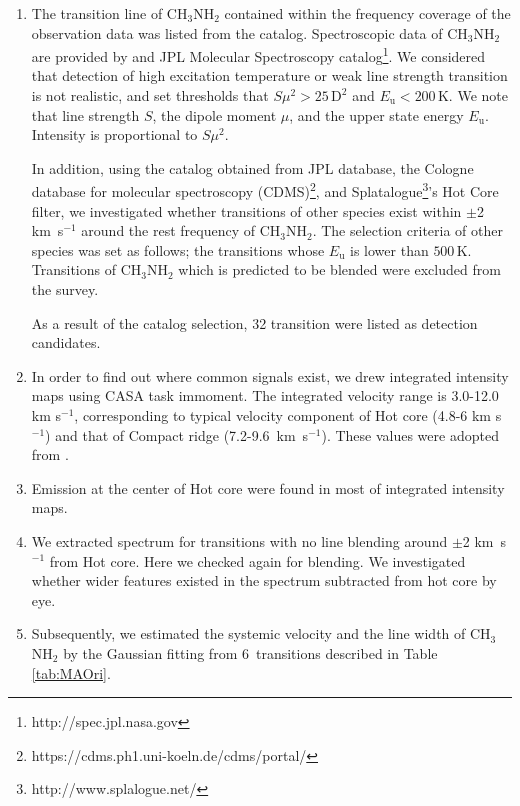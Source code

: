 \begin{enumerate}
\item The transition line of CH$_3$NH$_2$ contained within the frequency coverage of the observation data was listed from the catalog. Spectroscopic data of CH$_3$NH$_2$ are provided by \citet{Motiyenko+2014} and JPL Molecular Spectroscopy catalog\footnote{http://spec.jpl.nasa.gov}.
We considered that detection of high excitation temperature or weak line strength transition 
is not realistic, and set thresholds that $S\mu^2 > 25\,\mathrm{D^2}$ and $E_{\mathrm{u}} < 200 \,\mathrm{K}$. We note that line strength $S$, the dipole moment $\mu$, and the upper state energy 
$E_{\mathrm{u}}$. Intensity is proportional to $S\mu^2$.

In addition, using the catalog obtained from JPL database, the Cologne database for molecular 
spectroscopy (CDMS)\footnote{https://cdms.ph1.uni-koeln.de/cdms/portal/}, 
and Splatalogue\footnote{http://www.splalogue.net/}'s Hot Core filter, 
we investigated whether transitions of other species exist within $\pm$2 km~s$^{-1}$ 
around the rest frequency of CH$_3$NH$_2$.  The selection criteria of other species was set as follows; 
the transitions whose $E_{\mathrm{u}}$ is lower than $500\, \mathrm{K}$.
Transitions of CH$_3$NH$_2$ which is predicted to be blended were excluded from the survey.

As a result of the catalog selection, 32 transition were listed as detection candidates.

\item In order to find out where common signals exist, we drew integrated intensity maps 
using CASA task {\sc immoment}. The integrated velocity range is 3.0-12.0 km s$^{-1}$, corresponding to
typical velocity component of Hot core (4.8-6 km s$^{-1}$) and that of Compact ridge 
(7.2-9.6~km~s$^{-1}$). These values were adopted from \citet{Feng+2015}.

\item Emission at the center of Hot core were found in most of integrated intensity maps. 

\item We extracted spectrum for transitions with no line blending around $\pm$2 km~s$^{-1}$ from Hot core. Here we checked again for blending. We investigated whether wider features existed 
in the spectrum subtracted from hot core by eye.

\item Subsequently, we estimated the systemic velocity and the line width of CH$_3$NH$_2$ 
by the Gaussian fitting from 6~transitions described in Table \ref{tab:MAOri}.
\end{enumerate}
